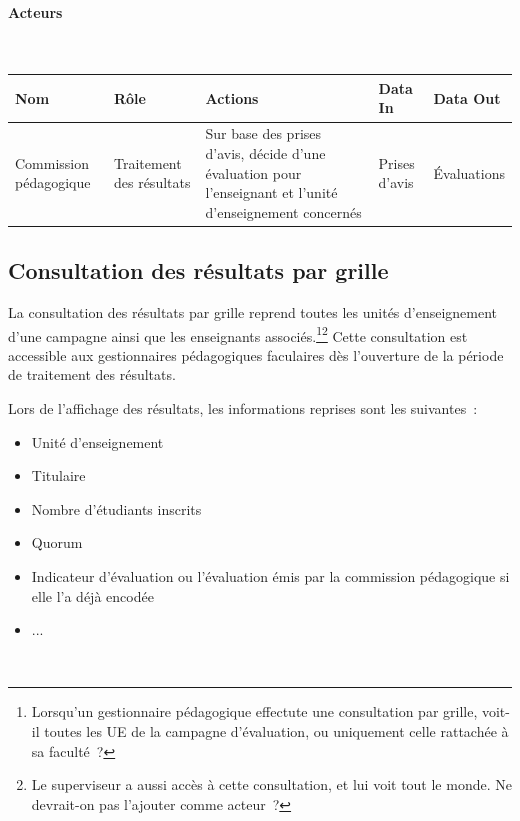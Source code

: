 \documentclass[a4paper,11pt]{report}
\begin{document}
\paragraph{Acteurs}~\newline{}

\begin{tabularx}{\linewidth}{|X|X|X|X|X|} \hline
Nom & Rôle & Actions & Data In & Data Out \\ \hline 
Commission pédagogique & Traitement des résultats & Sur base des prises d'avis, décide d'une évaluation pour l'enseignant et l'unité d'enseignement concernés & Prises d'avis & Évaluations \\ \hline
\end{tabularx}






\subsection{Consultation des résultats par grille}
La consultation des résultats par grille reprend toutes les unités d'enseignement  d'une campagne ainsi que les enseignants associés.\footnote{Lorsqu'un gestionnaire pédagogique effectute une consultation par grille, voit-il toutes les UE de la campagne d'évaluation, ou uniquement celle rattachée à sa faculté~?}\footnote{Le superviseur a aussi accès à cette consultation, et lui voit tout le monde. Ne devrait-on pas l'ajouter comme acteur~?}
Cette consultation est accessible aux gestionnaires pédagogiques faculaires dès l'ouverture de la période de traitement des résultats.

Lors de l'affichage des résultats, les informations reprises sont les suivantes~:
\begin{itemize}
	\item Unité d'enseignement
	\item Titulaire
	\item Nombre d'étudiants inscrits
	\item Quorum
	\item Indicateur d'évaluation ou l'évaluation émis par la commission pédagogique si elle l'a déjà encodée
	\item ...
\end{itemize}
~\\
\end{document}
